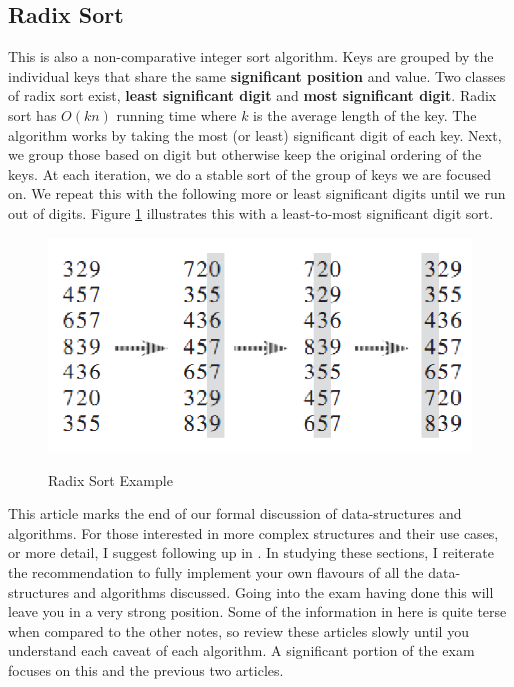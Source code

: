 \documentclass[10pt,a4paper]{article}
\begin{document}
\subsection{Radix Sort}
This is also a non-comparative integer sort algorithm. Keys are grouped by the individual keys that share the same {\bf significant position} and value. Two classes of radix sort exist, {\bf least significant digit} and {\bf most significant digit}. Radix sort has $O(kn)$ running time where $k$ is the average length of the key. 
\newline\newline
The algorithm works by taking the most (or least) significant digit of each key. Next, we group those based on digit but otherwise keep the original ordering of the keys. At each iteration, we do a stable sort of the group of keys we are focused on. We repeat this with the following more or least significant digits until we run out of digits. Figure \ref{radix} illustrates this with a least-to-most significant digit sort. 
\begin{figure}
\caption{Radix Sort Example \cite{INTROALG}}
\begin{center}
\includegraphics[scale=0.43]{../images/radix-sort.png}
\label{radix}
\end{center}
\end{figure}
\newline\newline
This article marks the end of our formal discussion of data-structures and algorithms. For those interested in more complex structures and their use cases, or more detail, I suggest following up in \cite{INTROALG}. In studying these sections, I reiterate the recommendation to fully implement your own flavours of all the data-structures and algorithms discussed. Going into the exam having done this will leave you in a very strong position. Some of the information in here is quite terse when compared to the other notes, so review these articles slowly until you understand each caveat of each algorithm. A significant portion of the exam focuses on this and the previous two articles. 
{}

\begin{center}
\end{center}
\end{document}
